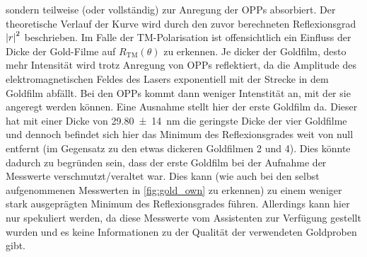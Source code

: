 sondern teilweise (oder vollständig) zur Anregung der OPPs absorbiert. Der theoretische Verlauf der Kurve wird durch den zuvor berechneten Reflexionsgrad $\abs{r}^2$ beschrieben. Im Falle der TM-Polarisation ist offensichtlich ein Einfluss der Dicke der Gold-Filme auf $R_{\mathrm{TM}}(\theta)$
zu erkennen. Je dicker der Goldfilm, desto mehr Intensität wird trotz Anregung von OPPs reflektiert, da die Amplitude des elektromagnetischen Feldes des Lasers exponentiell mit der Strecke in
dem Goldfilm abfällt. Bei den OPPs kommt dann weniger Intenstität an, mit der sie angeregt werden können. Eine Ausnahme stellt hier der erste Goldfilm da. Dieser
hat mit einer Dicke von \SI{29,80(14)}{\nm} die geringste Dicke der vier Goldfilme und dennoch befindet sich hier das Minimum des Reflexionsgrades weit von null entfernt
(im Gegensatz zu den etwas dickeren Goldfilmen 2 und 4). Dies könnte dadurch zu begründen sein, dass der erste Goldfilm bei der Aufnahme der Messwerte verschmutzt/veraltet war.
Dies kann (wie auch bei den selbst aufgenommenen Messwerten in \cref{fig:gold_own} zu erkennen) zu einem weniger stark ausgeprägten Minimum des Reflexionsgrades führen. Allerdings
kann hier nur spekuliert werden, da diese Messwerte vom Assistenten zur Verfügung gestellt wurden und es keine Informationen zu der Qualität der verwendeten Goldproben gibt.